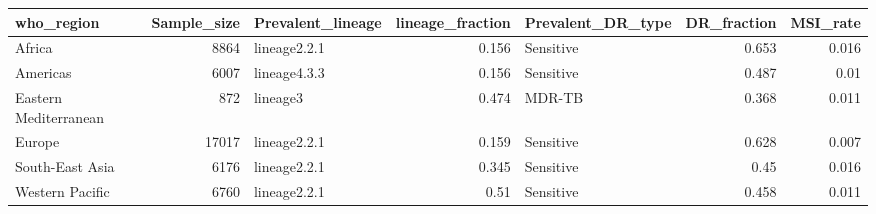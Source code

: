 \begin{tabular}{lrlrlrr}
\hline
 who\_region            &   Sample\_size & Prevalent\_lineage   &   lineage\_fraction & Prevalent\_DR\_type   &   DR\_fraction &   MSI\_rate \\
\hline
 Africa                &          8864 & lineage2.2.1        &              0.156 & Sensitive           &         0.653 &      0.016 \\
 Americas              &          6007 & lineage4.3.3        &              0.156 & Sensitive           &         0.487 &      0.01  \\
 Eastern Mediterranean &           872 & lineage3            &              0.474 & MDR-TB              &         0.368 &      0.011 \\
 Europe                &         17017 & lineage2.2.1        &              0.159 & Sensitive           &         0.628 &      0.007 \\
 South-East Asia       &          6176 & lineage2.2.1        &              0.345 & Sensitive           &         0.45  &      0.016 \\
 Western Pacific       &          6760 & lineage2.2.1        &              0.51  & Sensitive           &         0.458 &      0.011 \\
\hline
\end{tabular}